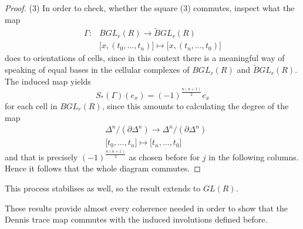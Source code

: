 {\begin{proof}
(3) In order to check, whether the square (3) commutes, inspect what the map
$$\begin{aligned}\Gamma \colon & BGL_r(R) \rightarrow \tilde{B}GL_r(R)\\
   &\lbrack x,(t_0,\ldots,t_n) \rbrack \mapsto \lbrack x,(t_n,\ldots,t_0)\rbrack
  \end{aligned}$$
does to orientations of cells, since in this context there is a meaningful way of speaking of equal bases in the cellular complexes of
$BGL_r(R)$ and $\tilde{B}GL_r(R)$.
The induced map yields
$$S_*(\Gamma)(e_x) = (-1)^{\frac{n(n+1)}{2}}e_x$$
for each cell in $BGL_r(R)$, since this amounts to calculating the degree of the map
$$\begin{aligned}
   &\Delta^n/(\partial \Delta^n) \rightarrow \Delta^n/(\partial \Delta^n)\\
   &\lbrack t_0,\ldots,t_n\rbrack \mapsto \lbrack t_n,\ldots, t_0\rbrack
  \end{aligned}$$
and that is precisely $(-1)^{\frac{n(n+1)}{2}}$ as chosen before for $j$ in the following columns. Hence it follows that the whole diagram commutes.
\end{proof}}

This process stabilises as well, so the result extends to $GL(R)$.


These results provide almost every coherence needed in order to show that the Dennis trace map commutes with the induced involutions defined before.

